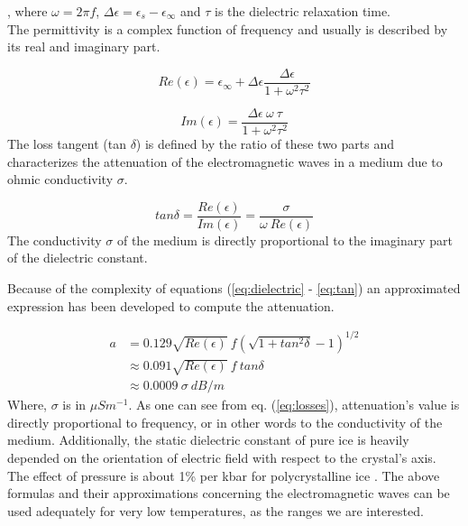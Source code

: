 , where $\omega = 2\pi f$, $\Delta \epsilon=\epsilon_{s} -\epsilon_{\infty}$ and $\tau$ is the dielectric relaxation time. \\
The permittivity is a complex function of frequency and usually is described by its real and imaginary part.

\begin{equation}
    Re (\epsilon)=\epsilon_{\infty}+\Delta \epsilon \frac{\Delta \epsilon}{1+ \omega^2 \tau^2}
\end{equation}

\begin{equation}
    Im (\epsilon)=\frac{\Delta \epsilon\ \omega\  \tau}{1+ \omega^2 \tau^2}
\end{equation}
The loss tangent (tan $\delta$) is defined by the ratio of these two parts and characterizes the attenuation of the electromagnetic waves in a medium due to ohmic conductivity $\sigma$. 

\begin{equation}
    tan \delta=\frac{Re(\epsilon)}{Im(\epsilon)}=\frac{\sigma}{\omega\ Re(\epsilon)}
    \label{eq:tan}
\end{equation}
The conductivity $\sigma$ of the medium is directly proportional to the imaginary part of the dielectric constant.

Because of the complexity of equations (\ref{eq:dielectric} - \ref{eq:tan}) an approximated expression has been developed to compute the attenuation.

\begin{align}\label{eq:losses}
    a &= 0.129 \sqrt{Re(\epsilon)}\ f (\sqrt{1+tan^2 \delta}-1)^{1/2} \\ \nonumber
      &\approx 0.091 \sqrt{Re(\epsilon)}\ f\ tan \delta \\ \nonumber
      &\approx 0.0009\ \sigma\ dB/m
\end{align}
Where, $\sigma$ is in $\mu S m^{-1}$. As one can see from eq. (\ref{eq:losses}), attenuation's value is directly proportional to frequency, or in other words to the conductivity of the medium. Additionally, the static dielectric constant of pure ice is heavily depended on the orientation of electric field with respect to the crystal's axis. The effect of pressure is about 1\% per kbar for polycrystalline ice \cite{Kofman_2010}. The above formulas and their approximations concerning the electromagnetic waves can be used adequately for very low temperatures, as the ranges we are interested.

